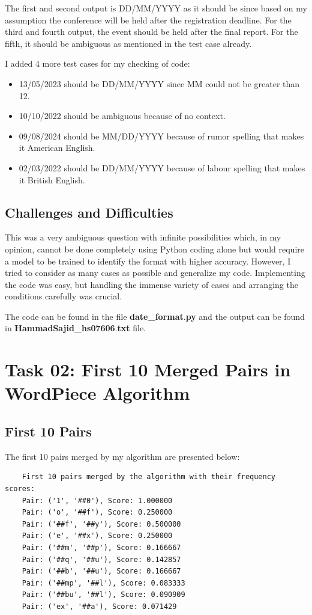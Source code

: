\documentclass[a4paper,12pt]{article}
\begin{document}
The first and second output is DD/MM/YYYY as it should be since based on my assumption 
the conference will be held after the registration deadline. For the third and fourth 
output, the event should be held after the final report. For the fifth, it should be 
ambiguous as mentioned in the test case already.

I added 4 more test cases for my checking of code:

\begin{itemize}
    \item 13/05/2023 should be DD/MM/YYYY since MM could not be greater than 12.
    \item 10/10/2022 should be ambiguous because of no context.
    \item 09/08/2024 should be MM/DD/YYYY because of rumor spelling that makes it American English.
    \item 02/03/2022 should be DD/MM/YYYY  because of labour spelling that makes it British English.
\end{itemize}

\subsection{Challenges and Difficulties}

This was a very ambiguous question with infinite possibilities which, in my opinion, cannot be done completely using Python coding alone but would require a model to be trained to identify the format with higher accuracy. However, I tried to consider as many cases as possible and generalize my code. Implementing the code was easy, but handling the immense variety of cases and arranging the conditions carefully was crucial.

The code can be found in the file \textbf{date\_format$.$py} and the output can be found in \textbf{HammadSajid\_hs07606$.$txt} file.

\section{Task 02: First 10 Merged Pairs in WordPiece Algorithm}

\subsection{First 10 Pairs}

The first 10 pairs merged by my algorithm are presented below:

\begin{verbatim}
    First 10 pairs merged by the algorithm with their frequency scores:
    Pair: ('1', '##0'), Score: 1.000000
    Pair: ('o', '##f'), Score: 0.250000
    Pair: ('##f', '##y'), Score: 0.500000
    Pair: ('e', '##x'), Score: 0.250000
    Pair: ('##m', '##p'), Score: 0.166667
    Pair: ('##q', '##u'), Score: 0.142857
    Pair: ('##b', '##u'), Score: 0.166667
    Pair: ('##mp', '##l'), Score: 0.083333
    Pair: ('##bu', '##l'), Score: 0.090909
    Pair: ('ex', '##a'), Score: 0.071429
\end{verbatim}
\end{document}
